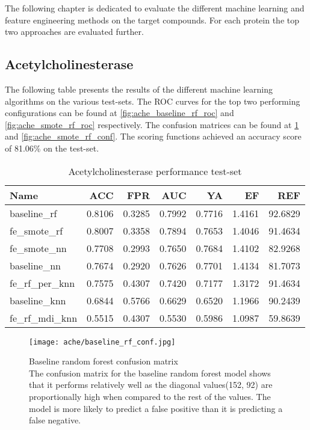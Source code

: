 \label{cha:performance_protein}
The following chapter is dedicated to evaluate the different machine learning and feature engineering methods on
the target compounds. For each protein the top two approaches are evaluated further.

\subsection{Acetylcholinesterase}
The following table presents the results of the different machine learning algorithms on the various
test-sets. The ROC curves for the top two performing configurations can be found at \ref{fig:ache_baseline_rf_roc} and \ref{fig:ache_smote_rf_roc}
respectively. The confusion matrices can be found at \ref{fig:ache_baseline_rf_conf} and \ref{fig:ache_smote_rf_conf}.
The scoring functions achieved an accuracy score of 81.06\% on the test-set.
\begin{table}[H]
    \begin{center}
        \caption{Acetylcholinesterase performance test-set}
        \begin{tabular}{lrrrrrr}
            \toprule
            Name             & ACC    & FPR    & AUC    & YA     & EF     & REF     \\
            \midrule
            baseline\_rf     & 0.8106 & 0.3285 & 0.7992 & 0.7716 & 1.4161 & 92.6829 \\
            fe\_smote\_rf    & 0.8007 & 0.3358 & 0.7894 & 0.7653 & 1.4046 & 91.4634 \\
            fe\_smote\_nn    & 0.7708 & 0.2993 & 0.7650 & 0.7684 & 1.4102 & 82.9268 \\
            baseline\_nn     & 0.7674 & 0.2920 & 0.7626 & 0.7701 & 1.4134 & 81.7073 \\
            fe\_rf\_per\_knn & 0.7575 & 0.4307 & 0.7420 & 0.7177 & 1.3172 & 91.4634 \\
            baseline\_knn    & 0.6844 & 0.5766 & 0.6629 & 0.6520 & 1.1966 & 90.2439 \\
            fe\_rf\_mdi\_knn & 0.5515 & 0.4307 & 0.5530 & 0.5986 & 1.0987 & 59.8639 \\
            \bottomrule
        \end{tabular}
    \end{center}
\end{table}

\begin{figure}[H]
    \begin{center}
        \captionsetup{justification=centering}
        \texttt{[image: ache/baseline\_rf\_conf.jpg]}
        \caption[]{Baseline random forest confusion matrix\\The confusion matrix for the baseline random forest model shows that it performs relatively well as the diagonal values(152, 92) are proportionally high
            when compared to the rest of the values. The model is more likely to predict a false positive than it is predicting a false negative.}
        \label{fig:ache_baseline_rf_conf}
    \end{center}
\end{figure}


